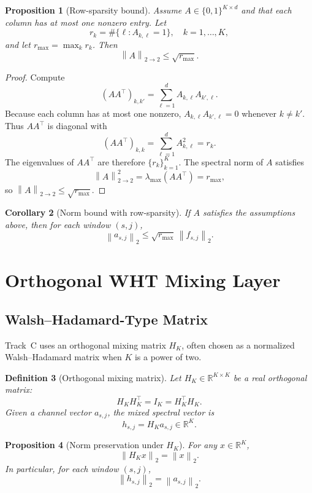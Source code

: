 \documentclass[11pt]{article}
\newtheorem{definition}{Definition}[section]
\newtheorem{proposition}[definition]{Proposition}
\newtheorem{corollary}[definition]{Corollary}
\newcommand{\R}{\mathbb{R}}
\newcommand{\norm}[1]{\left\lVert #1 \right\rVert}
\begin{document}
\begin{proposition}[Row-sparsity bound]
Assume \(A \in \{0,1\}^{K \times d}\) and that each column has at most one nonzero entry.
Let
\[
  r_k = \#\{ \ell : A_{k,\ell} = 1 \}, \quad k=1,\dots,K,
\]
and let \(r_{\max} = \max_k r_k\).
Then
\[
  \norm{A}_{2\to2} \le \sqrt{r_{\max}}.
\]
\end{proposition}

\begin{proof}
Compute
\[
  (A A^\top)_{k,k'} = \sum_{\ell=1}^d A_{k,\ell} A_{k',\ell}.
\]
Because each column has at most one nonzero, \(A_{k,\ell} A_{k',\ell} = 0\) whenever \(k \ne k'\).
Thus \(A A^\top\) is diagonal with
\[
  (A A^\top)_{k,k} = \sum_{\ell=1}^d A_{k,\ell}^2 = r_k.
\]
The eigenvalues of \(A A^\top\) are therefore \(\{r_k\}_{k=1}^K\).
The spectral norm of \(A\) satisfies
\[
  \norm{A}_{2\to2}^2 = \lambda_{\max}(A A^\top) = r_{\max},
\]
so \(\norm{A}_{2\to2} \le \sqrt{r_{\max}}\).
\end{proof}

\begin{corollary}[Norm bound with row-sparsity]
If \(A\) satisfies the assumptions above, then for each window \((s,j)\),
\[
  \norm{a_{s,j}}_2 \le \sqrt{r_{\max}} \,\norm{f_{s,j}}_2.
\]
\end{corollary}

\section{Orthogonal WHT Mixing Layer}

\subsection{Walsh--Hadamard-Type Matrix}

Track~C uses an orthogonal mixing matrix \(H_K\), often chosen as a normalized Walsh--Hadamard matrix when \(K\) is a power of two.

\begin{definition}[Orthogonal mixing matrix]
Let \(H_K \in \R^{K \times K}\) be a real orthogonal matrix:
\[
  H_K H_K^\top = I_K = H_K^\top H_K.
\]
Given a channel vector \(a_{s,j}\), the mixed spectral vector is
\[
  h_{s,j} = H_K a_{s,j} \in \R^K.
\]
\end{definition}

\begin{proposition}[Norm preservation under \(H_K\)]
For any \(x \in \R^K\),
\[
  \norm{H_K x}_2 = \norm{x}_2.
\]
In particular, for each window \((s,j)\),
\[
  \norm{h_{s,j}}_2 = \norm{a_{s,j}}_2.
\]
\end{proposition}
\end{document}
